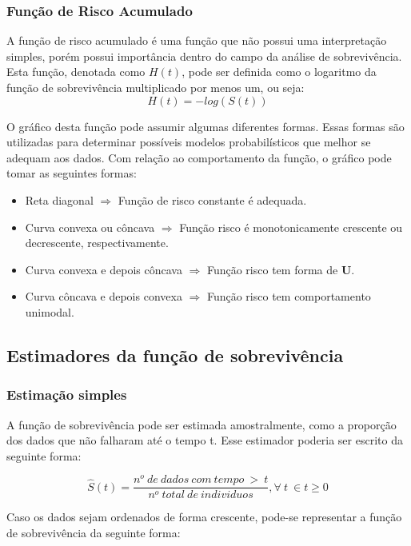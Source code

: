 \documentclass[a4paper,12pt]{article}
\begin{document}
\subsubsection{Função de Risco Acumulado}

A função de risco acumulado é uma função que não possui uma interpretação simples, porém possui importância dentro do campo da análise de sobrevivência. Esta função, denotada como $H(t)$, pode ser definida como o logaritmo da função de sobrevivência multiplicado por menos um, ou seja:
\begin{equation} \label{eq:riskcum}
 H(t) = -log(S(t))
\end{equation}

O gráfico desta função pode assumir algumas diferentes formas. Essas formas são utilizadas para determinar possíveis modelos probabilísticos que melhor se adequam aos dados. Com relação ao comportamento da função, o gráfico pode tomar as seguintes formas:

\begin{itemize}
	\item Reta diagonal $\Rightarrow$ Função de risco constante é adequada.
	\item Curva convexa ou côncava $\Rightarrow$ Função
risco é monotonicamente crescente ou decrescente, respectivamente.
	\item Curva convexa e depois côncava $\Rightarrow$ Função risco tem forma de \textbf{U}.
	\item Curva côncava e depois convexa $\Rightarrow$ Função risco tem comportamento unimodal.
\end{itemize}

\subsection{Estimadores da função de sobrevivência}

\subsubsection{Estimação simples}

A função de sobrevivência pode ser estimada amostralmente, como a proporção dos dados que não falharam até o tempo t. Esse estimador poderia ser escrito da seguinte forma:

$$ \hat{S}(t) = \dfrac{n^o \ de \ dados \ com \ tempo \ > \ t}{n^o \ total \ de \ individuos}, \forall \ t \ \in t\ge 0$$

Caso os dados sejam ordenados de forma crescente, pode-se representar a função de sobrevivência da seguinte forma:
\end{document}
